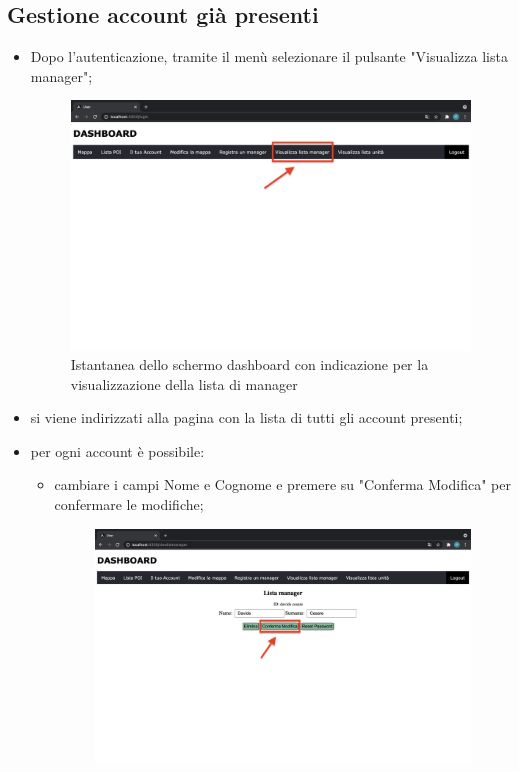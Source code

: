 \subsection{Gestione account già presenti}
\begin{itemize}
    \item Dopo l'autenticazione, tramite il menù selezionare il pulsante "Visualizza lista manager";
    \begin{figure}[H]
        \centering
        \includegraphics[scale=0.12]{res/images/dashboard5.png}
        \caption{Istantanea dello schermo dashboard con indicazione per la visualizzazione della lista di manager}
    \end{figure}
    \item si viene indirizzati alla pagina con la lista di tutti gli account presenti;
    \item per ogni account è possibile:
        \begin{itemize}
            \item cambiare i campi Nome e Cognome e premere su "Conferma Modifica" per confermare le modifiche;
            \begin{figure}[H]
                \centering
                \includegraphics[scale=0.12]{res/images/modificamanager.png}

\end{figure}
\end{itemize}
\end{itemize}
